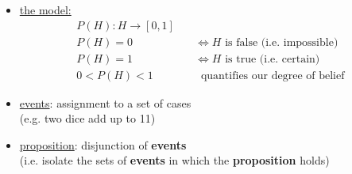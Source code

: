 \begin{frame}\frametitle{\subsecname}

\begin{itemize}
    \item \underline{the model:}\\
        \begin{align}
            P(H): H \rightarrow [0,1]&\\
            P(H) = 0 & \quad\iff H \text{ is false (i.e. impossible)} \\
            P(H) = 1 & \quad\iff H \text{ is true (i.e. certain)} \\
            0 < P(H) < 1 & \quad\;\;\text{quantifies our degree of belief}
        \end{align}
    \pause
    
    
    \item \underline{events}: assignment to a set of cases\\
    (e.g. two dice add up to 11)
    \pause
    \item \underline{proposition}: disjunction of \textbf{events}\\
    (i.e. isolate the sets of \textbf{events} in which the \textbf{proposition} holds)\\
    
\end{itemize}
    
\end{frame}

